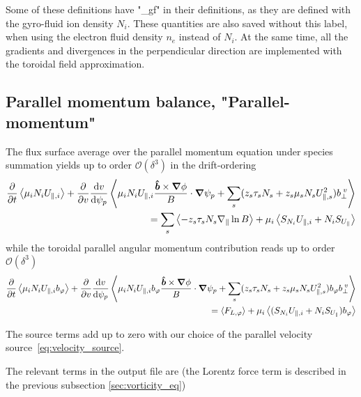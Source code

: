 Some of these definitions have "\_gf" in their definitions, as they are defined with the gyro-fluid ion density $N_i$. These quantities are also saved without this label, when using the electron fluid density $n_e$ instead of $N_i$. At the same time, all the gradients and divergences in the perpendicular direction are implemented with the toroidal field approximation.


\subsection{Parallel momentum balance, "Parallel-momentum"}
The flux surface average over the parallel momentum equation under species summation  yields up to order $\mathcal O(\delta^3)$ in the drift-ordering
\begin{align}
  \frac{\partial}{\partial t}\left \langle \mu_iN_iU_{\parallel,i}  \right \rangle
    + \frac{\partial}{\partial v} \frac{\mathrm{d} v}{\mathrm{d}\psi_p} \left \langle \mu_iN_iU_{\parallel,i} \frac{\bm{\hat{b}}\times{\boldsymbol{\nabla}}\phi}{B}\cdot{\boldsymbol{\nabla}}\psi_p + \sum_s (z_s\tau_sN_s + z_s\mu_s N_sU_{\parallel,s}^2) b_{\perp}^{\;v}   \right \rangle
    \nonumber\\
   = \sum_s\left \langle -z_s\tau_s N_s\nabla_\parallel \ln B \right \rangle + \mu_i \left \langle  S_{N_i} U_{\parallel,i} + N_i S_{U_\parallel} \right \rangle
   \label{eq:parallel_momentum}
\end{align}
while the toroidal parallel angular momentum contribution reads up to order $\mathcal O(\delta^3)$
\begin{align}\label{eq:parallel_momentum_direction}
    \frac{\partial}{\partial t}  \left \langle \mu_iN_iU_{\parallel,i} b_\varphi \right \rangle
    + \frac{\partial}{\partial v} \frac{\mathrm{d} v}{\mathrm{d}\psi_p} \left \langle \mu_iN_iU_{\parallel,i} b_\varphi\frac{\bm{\hat{b}}\times{\boldsymbol{\nabla}}\phi}{B}\cdot{\boldsymbol{\nabla}}\psi_p + \sum_s (z_s\tau_s N_s + z_s\mu_sN_sU_{\parallel,s}^2) b_\varphi b_{\perp}^{\;v}  \right \rangle
    \nonumber\\
    = \left \langle F_{L,\varphi} \right \rangle + \mu_i \left \langle  (S_{N_i} U_{\parallel,i} + N_i S_{U_\parallel}) b_\varphi \right \rangle
\end{align}
\begin{tcolorbox}[title=Note]
The source terms add up to zero with our choice of the parallel velocity source~\eqref{eq:velocity_source}.
\end{tcolorbox}
The relevant terms in the output file are (the Lorentz force term is described in the previous subsection \ref{sec:vorticity_eq})
